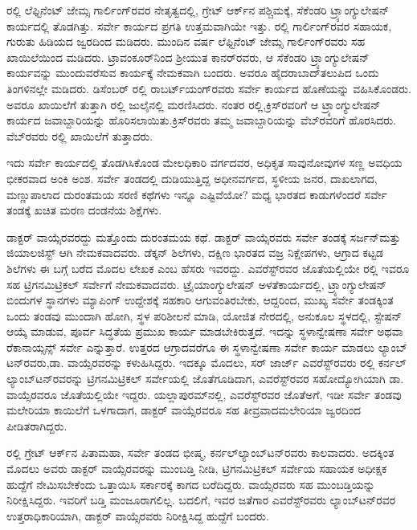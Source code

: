 ರಲ್ಲಿ ಲೆಫ್ಟಿನೆಂಟ್​ ಜೇಮ್ಸ ಗಾರ್ಲಿಂಗ್​ರವರ ನೇತೃತ್ವದಲ್ಲಿ, ಗ್ರೇಟ್​ ಆರ್ಕ್‌ನ ಪಶ್ಚಿಮಕ್ಕೆ, ಸೆಕೆಂಡರಿ ಟ್ರ್ಯಾಂಗ್ಯುಲೇಷನ್​ ಕಾರ್ಯದಲ್ಲಿ ತೊಡಗಿತ್ತು. ಸರ್ವೇ ಕಾರ್ಯದ ಪ್ರಗತಿ ಉತ್ತಮವಾಗಿಯೇ ಇತ್ತು. ರಲ್ಲಿ ಗಾರ್ಲಿಂಗ್​ರವರ ಸಹಾಯಕ, ಗುರುತು ಹಿಡಿಯದ ಜ್ವರದಿಂದ ಮಡಿದರು. ಮುಂದಿನ ವರ್ಷ ಲೆಫ್ಟಿನೆಂಟ್​ ಜೇಮ್ಸ ಗಾರ್ಲಿಂಗ್​ರವರು ಸಹ ಖಾಯಿಲೆಯಿಂದ ಮಡಿದರು. ಟ್ರಾವಂಕೂರ್​ನಿಂದ ಶ‍್ರೀಯುತ ಕಾನರ್​ರವರು, ಆ ಸೆಕೆಂಡರಿ ಟ್ರ್ಯಾಂಗ್ಯುಲೇಷನ್​ ಕಾರ್ಯವನ್ನು ಮುಂದುವರೆಸುವ ಕಾರ್ಯಕ್ಕೆ ನೇಮಕವಾಗಿ ಬಂದರು. ಅವರೂ ಹೈದರಾಬಾದ್​ ತಲುಪಿದ ಒಂದು ತಿಂಗಳಿನಲ್ಲೇ ಮಡಿದರು. ಡಿಸೆಂಬರ್​ ರಲ್ಲಿ ರಾಬರ್ಟ್‌ಯಂಗ್​ರವರು ಸರ್ವೇ ಕಾರ್ಯದ ಹೊಣೆಯನ್ನು ವಹಿಸಿಕೊಂಡರು. ಅವರೂ ಖಾಯಿಲೆಗೆ ತುತ್ತಾಗಿ ರಲ್ಲಿ ಜುಲೈನಲ್ಲಿ ಮರಣಿಸಿದರು. ನಂತರ ರಲ್ಲಿ,\break ಕ್ರಿಸ್​ರವರಿಗೆ ಆ ಟ್ರ್ಯಾಂಗ್ಯುಲೇಷನ್​ ಕಾರ್ಯದ ಜವಾಬ್ದಾರಿಯನ್ನು ಹೊರಿಸಲಾಯಿತು.\break ಕ್ರಿಸ್​ರವರು ತಮ್ಮ ಜವಾಬ್ದಾರಿಯನ್ನು ವೆಬ್​ರವರಿಗೆ ಹೊರಸಿದರು. ವೆಬ್​ರವರು ರಲ್ಲಿ ಖಾಯಿಲೆಗೆ ತುತ್ತಾದರು.

ಇದು ಸರ್ವೇ ಕಾರ್ಯದಲ್ಲಿ ತೊಡಗಿಸಿಕೊಂಡ ಮೇಲಧಿಕಾರಿ ವರ್ಗದವರ, ಅಧಿಕೃತ ಸಾವುನೋವುಗಳ ಸಣ್ಣ ಅವಧಿಯ ಭೀಕರವಾದ ಅಂಕಿ ಅಂಶ. ಸರ್ವೇ ತಂಡದಲ್ಲಿ ದುಡಿಯುತ್ತಿದ್ದ ಅಧೀನವರ್ಗದ, ಸ್ಥಳೀಯ ಜನರ, ದಾಖಲಾಗದ, ಮಣ್ಣುಪಾಲಾದ ದುರಂತಮಯ ಸರಣಿ ಕಥೆಗಳು ಇನ್ನೂ ಎಷ್ಟಿವೆಯೋ? ಮಧ್ಯ ಭಾರತದ ಕಾಡುಗಳೆಂದರೆ ಸರ್ವೇ ತಂಡಕ್ಕೆ ಖಚಿತ ಮರಣ ದಂಡನೆಯ ಶಿಕ್ಷೆಗಳು.

ಡಾಕ್ಟರ್​ ವಾಯ್ಸೆರವರದ್ದು ಮತ್ತೊಂದು ದುರಂತಮಯ ಕಥೆ. ಡಾಕ್ಟರ್​ ವಾಯ್ಸೆರವರು ಸರ್ವೇ ತಂಡಕ್ಕೆ ಸರ್ಜನ್​ ಮತ್ತು ಜಿಯಾಲಜಿಸ್ಟ್​ ಆಗಿ ನೇಮಕವಾದವರು. ಡೆಕ್ಕನ್​ ಶಿಲೆಗಳು, ದಕ್ಷಿಣ ಭಾರತದ ವಜ್ರ ನಿಕ್ಷೇಪಗಳು, ಆಗ್ರಾದ ಕಟ್ಟಡ ಶಿಲೆಗಳು ಈ ಬಗ್ಗೆ ಬರೆದ ಮೊದಲ ಲೇಖಕ ಎಂಬ ಹೆಸರು ಇವರದ್ದು. ಎವರೆಸ್ಟ್​ರವರ ಜೊತೆಯಲ್ಲಿಯೇ ರಲ್ಲಿ ಇವರೂ ಸಹ ಟ್ರಿಗನಮಿಟ್ರಿಕಲ್​ ಸರ್ವೇಗೆ ನೇಮಕವಾದವರು. ಟ್ರೈಯಾಂಗ್ಯುಲೇಷನ್​ ಅಳತೆ\break ಕಾರ್ಯದಲ್ಲಿ, ಟ್ರ್ಯಾಂಗ್ಯುಲೇಷನ್​ ಬಿಂದುಗಳ ಸ್ಥಾನಗಳು ಮ್ಯಾಪಿಂಗ್​ ಉದ್ದೇಶಕ್ಕೆ ಸಹಕಾರಿ ಆಗುವಂತಿರಬೇಕು, ಆದ್ದರಿಂದ, ಮುಖ್ಯ ಸರ್ವೇ ತಂಡಕ್ಕಿಂತ ಒಂದು ತಂಡವು ಮುಂದಾಗಿ ಹೋಗಿ, ಸ್ಥಳ ಪರಿಶೀಲನೆ ಮಾಡಿ, ಯೋಜಿತ ನೇರದಲ್ಲಿ, ಅನುಕೂಲ ಸ್ಥಳದಲ್ಲಿ, ಸ್ಟೇಷನ್​ ಆಯ್ಕೆ ಮಾಡುವ, ಪೂರ್ವ ಸಿದ್ಧತೆಯ ಪ್ರಮುಖ ಕಾರ್ಯ ಮಾಡಬೇಕಿರುತ್ತದೆ. ಇದನ್ನು ಸ್ಥಳಾನ್ವೇಷಣಾ ಸರ್ವೇ ಅಥವಾ ರೆಕಾನಾಯ್ಸನ್ಸ್​ ಸರ್ವೇ ಎನ್ನುತ್ತಾರೆ. ಉತ್ತರದ ಆಗ್ರಾದವರೆಗೂ ಈ ಸ್ಥಳಾನ್ವೇಷಣಾ ಸರ್ವೇ ಕಾರ್ಯ ಮಾಡಲು ಲ್ಯಾಂಬ್​ಟನ್​ರವರು,\break ಡಾ. ವಾಯ್ಸೆರವರನ್ನು ಕಳುಹಿಸಿದ್ದರು. ಇದಕ್ಕೂ ಮೊದಲು, ಸರ್​ ಜಾರ್ಜ್ ಎವರೆಸ್ಟ್​ರವರು ರಲ್ಲಿ ಕರ್ನಲ್​ ಲ್ಯಾಂಬ್​ಟನ್​ರವರನ್ನು ಟ್ರಿಗನಮಿಟ್ರಿಕಲ್​ ಸರ್ವೇಯಲ್ಲಿ ಜೊತೆಗೂಡಿದಾಗ, ಎವರೆಸ್ಟ್​ರವರ ಸಹೋದ್ಯೋಗಿಯಾಗಿ ಡಾ. ವಾಯ್ಸೆರವರೂ ಜೊತೆಯಲ್ಲಿಯೇ ಇದ್ದರು. ಯಲ್ಲಾಪುರಮ್‌ನಲ್ಲಿ, ಎವರೆಸ್ಟ್​ರವರ ಜೊತೆಅಗೆ, ಇಡೀ ಸರ್ವೇ ತಂಡವು ಮಲೇರಿಯಾ ಕಾಯಿಲೆಗೆ ಒಳಗಾದಾಗ, ಡಾಕ್ಟರ್​ ವಾಯ್ಸೆರವರೂ ಸಹ ತೀವ್ರವಾದ\break ಮಲೇರಿಯಾ ಜ್ವರದಿಂದ ಪೀಡಿತರಾಗಿದ್ದರು.

ರಲ್ಲಿ ಗ್ರೇಟ್​ ಆರ್ಕ್‌ನ ಪಿತಾಮಹಾ, ಸರ್ವೇ ತಂಡದ ಭೀಷ್ಮ, ಕರ್ನಲ್​\break ಲ್ಯಾಂಬ್​ಟನ್​ರವರು ಕಾಲವಾದರು. ಅದಕ್ಕಿಂತ ಮೊದಲು ಅವರು ಡಾಕ್ಟರ್​ ವಾಯ್ಸೆರವರನ್ನು ಮುಂಬಡ್ತಿ ನೀಡಿ, ಟ್ರಿಗನಮಿಟ್ರಿಕಲ್​ ಸರ್ವೇಯ ಸಹಾಯಕ ಅಧೀಕ್ಷಕ ಹುದ್ದೆಗೆ ನೇಮಿಸಬೇಕೆಂದು ಒತ್ತಾಯಿಸಿ ಸರ್ಕಾರಕ್ಕೆ ಕಾಗದ ಬರೆದಿದ್ದರು. ವಾಯ್ಸೆರವರು ಸಹ ಮುಂಬಡ್ತಿಯನ್ನು ನಿರೀಕ್ಷಿಸಿದ್ದರು. ಇವರಿಗೆ ಬಡ್ತಿ ಮಂಜೂರಾಗಲಿಲ್ಲ. ಬದಲಿಗೆ, ಇವರ ಜತೆಗಾರ ಎವರೆಸ್ಟ್​ರವರು ಲ್ಯಾಂಬ್​ಟನ್​ರವರ ಉತ್ತರಾಧಿಕಾರಿಯಾಗಿ, ಡಾಕ್ಟರ್​ ವಾಯ್ಸೆರವರು ನಿರೀಕ್ಷಿಸಿದ್ದ ಹುದ್ದೆಗೆ ಬಂದರು.

